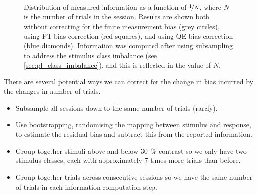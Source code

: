 \begin{figure}[htbp]
    \centering
    \hspace*{\fill}
    \hspace*{\fill}\hspace{.2cm}\hspace*{\fill}
    \hspace*{\fill}
    \\
    \hspace*{\fill}
    \hspace*{\fill}\hspace{.2cm}\hspace*{\fill}
    \hspace*{\fill}
    \caption{Distribution of measured information as a function of $\nicefrac{1}{N}$, where $N$ is the number of trials in the session.
Results are shown both without correcting for the finite measurement bias (grey circles), using \ac{PT} bias correction (red squares), and using \ac{QE} bias correction (blue diamonds).
Information was computed after using subsampling to address the stimulus class imbalance (see \autoref{sec:pl_class_imbalance}), and this is reflected in the value of $N$.
}
    \label{fig:IvN}
    \label{fig:I_vs_invN}
\end{figure}


There are several potential ways we can correct for the change in bias incurred by the changes in number of trials.
\begin{itemize}
\item Subsample all sessions down to the same number of trials (rarefy).
\item Use bootstrapping, randomising the mapping between stimulus and response, to estimate the residual bias and subtract this from the reported information.
\item Group together stimuli above and below \SI{30}{\percent} contrast so we only have two stimulus classes, each with approximately \num{7} times more trials than before.
\item Group together trials across consecutive sessions so we have the same number of trials in each information computation step.
\end{itemize}

